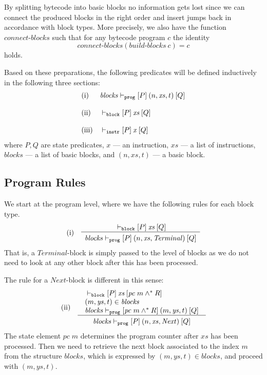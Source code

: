 \documentclass[sigplan,10pt,review]{acmart}\settopmatter{printfolios=true,printccs=false,printacmref=false}
\newcommand{\sconj}{\wedge^*}
\newcommand{\ttrip}[5]{\mathit{#1} \vdash_{\mathrm{#2}}[#3]\:#4\:[#5]}
\newcommand{\pc}{\mathit{pc}}
\newcommand{\RuleC}[2]{\begin{array}{c}#1\\\hline\noalign{\smallskip}#2\end{array}}
\newcommand{\bblocks}{\mathit{build\mbox{-}blocks}}
\newcommand{\cblocks}{\mathit{connect\mbox{-}blocks}}
\begin{document}
By splitting bytecode into basic blocks no information gets lost since we can connect the produced blocks
in the right order and insert jumps back in accordance with block types. More precisely, we also have the function
$\cblocks$ such that for any bytecode program $c$ the identity 
\[
\cblocks(\bblocks\:c) = c
\]
holds.  

Based on these preparations, the following predicates 
will be defined inductively in the following three sections:
\[
\begin{array}{l l}
\mbox{(i)} & \ttrip{\mathit{blocks}}{\mathtt{prog}}{P}{(n, \mathit{xs}, t)}{Q} \\
\\
\mbox{(ii)} & \ttrip{}{\mathtt{block}}{P}{\mathit{xs}}{Q} \\
\\
\mbox{(iii)} & \ttrip{}{\mathtt{instr}}{P}{\mathit{x}}{Q} 
\end{array}
\]
where $P, Q$ are state predicates, $x$ --- an instruction, $\mathit{xs}$ --- a list of instructions,
$\mathit{blocks}$ --- a list of basic blocks, and
$(n, \mathit{xs}, t)$ --- a basic block.%
%
\subsection{Program Rules}
\label{sec:prog-rules}
%
We start at the program level, where we have the following rules for
each block type.
\[
\begin{array}{l l}
\mbox{(i)} & \RuleC{\ttrip{}{\mathtt{block}}{P}{\mathit{xs}}{Q}}
     {\ttrip{\mathit{blocks}}{\mathtt{prog}}{P}{(n, \mathit{xs}, \mathit{Terminal})}{Q}}
\end{array}
\]
That is, a $\mathit{Terminal}$-block is simply passed to the level of
blocks as we do not need to look at any other block after this has been processed.  

The rule for a $\mathit{Next}$-block is different in this sense:
\[
\begin{array}{l l}
\mbox{(ii)} & \RuleC{\begin{array}{l} \ttrip{}{\mathtt{block}}{P}{\mathit{xs}}{\pc\;m \sconj R} \\
                                      (m, \mathit{ys},t) \in \mathit{blocks} \\
                                       \ttrip{\mathit{blocks}}{\mathtt{prog}}{\pc\;m \sconj R}{(m, \mathit{ys},t)}{Q}
                     \end{array}}
     {\ttrip{\mathit{blocks}}{\mathtt{prog}}{P}{(n, \mathit{xs}, \mathit{Next})}{Q}}
\end{array}
\]
The state element $\pc\;m$ determines the program counter after $\mathit{xs}$ has been
processed. Then we need to retrieve the next block associated to the index $m$ from the structure $\mathit{blocks}$,
which is expressed by $(m, \mathit{ys},t) \in \mathit{blocks}$, and proceed with 
$(m, \mathit{ys},t)$.
\end{document}

